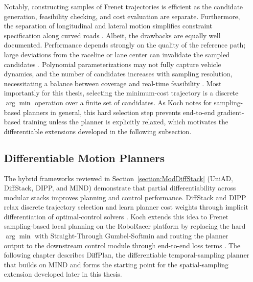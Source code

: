Notably, constructing samples of Frenet trajectories is efficient as the candidate generation, feasibility checking, and cost evaluation are separate.
Furthermore, the separation of longitudinal and lateral motion simplifies constraint specification along curved roads \cite{werling_OptimalTrajectoryGeneration_2010, gonzalez_ReviewMotionPlanning_2016}.
Albeit, the drawbacks are equally well documented.
Performance depends strongly on the quality of the reference path; large deviations from the raceline or lane center can invalidate the sampled candidates \cite{langmann_OnlineVelocityProfile_2025}.
Polynomial parameterizations may not fully capture vehicle dynamics, and the number of candidates increases with sampling resolution, necessitating a balance between coverage and real-time feasibility \cite{werling_OptimalTrajectoryGeneration_2010, muzzini_GPUImplementationFrenet_2024}.
Most importantly for this thesis, selecting the minimum-cost trajectory is a discrete $\arg\min$ operation over a finite set of candidates.
As Koch \cite{koch_DifferentiableInterpretablePath_2025} notes for sampling-based planners in general, this hard selection step prevents end-to-end gradient-based training unless the planner is explicitly relaxed, which motivates the differentiable extensions developed in the following subsection.

\subsection{Differentiable Motion Planners}

The hybrid frameworks reviewed in Section~\ref{section:ModDiffStack} (UniAD, DiffStack, DIPP, and MIND) demonstrate that partial differentiability across modular stacks improves planning and control performance.
DiffStack and DIPP relax discrete trajectory selection and learn planner cost weights through implicit differentiation of optimal-control solvers \cite{amos_OptNetDifferentiableOptimization_2017, blondel_EfficientModularImplicit_2022, pineda_TheseusLibraryDifferentiable_2022}.
Koch \cite{koch_DifferentiableInterpretablePath_2025} extends this idea to Frenet sampling-based local planning on the RoboRacer platform by replacing the hard $\arg\min$ with Straight-Through Gumbel-Softmin and routing the planner output to the downstream control module through end-to-end loss terms \cite{jang_CategoricalReparameterizationGumbel_2017, maddison_ConcreteDistributionContinuous_2017, bengio_EstimatingPropagatingGradients_2013}.
The following chapter describes DiffPlan, the differentiable temporal-sampling planner that builds on MIND and forms the starting point for the spatial-sampling extension developed later in this thesis.

